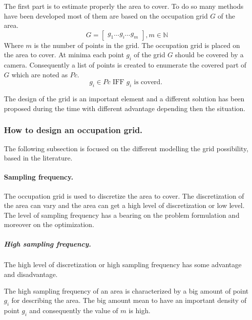 
The first part is to estimate properly the area to cover. To do so many methods have been developed most of them are based on the occupation grid $G$ of the area. 
\begin{equation}\label{eq:Grid}
	G=\begin{bmatrix}
	 	g_1 ...g_i ... g_m
	\end{bmatrix}  , m\in \mathbb{N}
\end{equation}
Where $m$ is the number of points in the grid.
The occupation grid is placed on the area to cover. At minima each point $g_i$ of the grid $G$ should be covered by a camera. Consequently a list of points is created to enumerate the covered part of $G$ which are noted as $Pc$.
\begin{equation}\label{eq:Pci}
g_i \in Pc \mbox{ IFF } g_i \mbox{ is coverd. }
\end{equation}


The design of the grid is an important element and a different solution has been proposed during the time with different advantage depending then the situation.\\

\subsubsection{How to design an occupation grid. }%
The following subsection is focused on the different  modelling the grid possibility, based in the literature. 

\paragraph{Sampling frequency.} %
The occupation grid is used to discretize the area to cover. The discretization of the area can vary and the area can get a high level of discretization or low level. The level of sampling frequency has a bearing on the problem formulation and moreover on the optimization.

\subparagraph{High sampling frequency.}
The high level of discretization or high sampling frequency has some advantage and disadvantage.
 
The high sampling frequency of an area is characterized by a big amount of point $g_i$ for describing the area. The big amount mean to have an important density of point $g_i$ and consequently the value of $m$ is high. 

